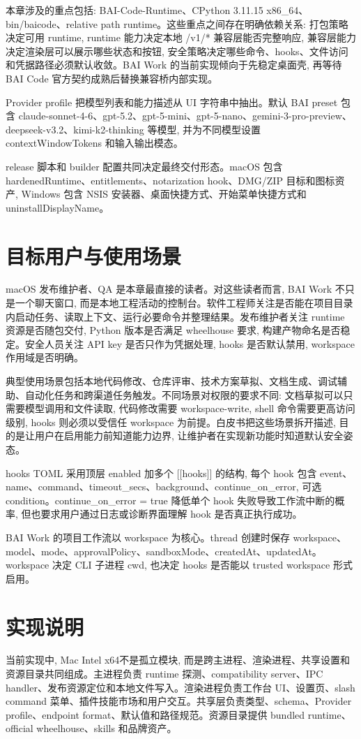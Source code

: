 本章涉及的重点包括: BAI-Code-Runtime、CPython 3.11.15 x86\_64、bin/baicode、relative path runtime。这些重点之间存在明确依赖关系: 打包策略决定可用 runtime, runtime 能力决定本地 /v1/* 兼容层能否完整响应, 兼容层能力决定渲染层可以展示哪些状态和按钮, 安全策略决定哪些命令、hooks、文件访问和凭据路径必须默认收敛。BAI Work 的当前实现倾向于先稳定桌面壳, 再等待 BAI Code 官方契约成熟后替换兼容桥内部实现。

Provider profile 把模型列表和能力描述从 UI 字符串中抽出。默认 BAI preset 包含 claude-sonnet-4-6、gpt-5.2、gpt-5-mini、gpt-5-nano、gemini-3-pro-preview、deepseek-v3.2、kimi-k2-thinking 等模型, 并为不同模型设置 contextWindowTokens 和输入输出模态。

release 脚本和 builder 配置共同决定最终交付形态。macOS 包含 hardenedRuntime、entitlements、notarization hook、DMG/ZIP 目标和图标资产, Windows 包含 NSIS 安装器、桌面快捷方式、开始菜单快捷方式和 uninstallDisplayName。

\section{目标用户与使用场景}
macOS 发布维护者、QA 是本章最直接的读者。对这些读者而言, BAI Work 不只是一个聊天窗口, 而是本地工程活动的控制台。软件工程师关注是否能在项目目录内启动任务、读取上下文、运行必要命令并整理结果。发布维护者关注 runtime 资源是否随包交付, Python 版本是否满足 wheelhouse 要求, 构建产物命名是否稳定。安全人员关注 API key 是否只作为凭据处理, hooks 是否默认禁用, workspace 作用域是否明确。

典型使用场景包括本地代码修改、仓库评审、技术方案草拟、文档生成、调试辅助、自动化任务和跨渠道任务触发。不同场景对权限的要求不同: 文档草拟可以只需要模型调用和文件读取, 代码修改需要 workspace-write, shell 命令需要更高访问级别, hooks 则必须以受信任 workspace 为前提。白皮书把这些场景拆开描述, 目的是让用户在启用能力前知道能力边界, 让维护者在实现新功能时知道默认安全姿态。

hooks TOML 采用顶层 enabled 加多个 [[hooks]] 的结构, 每个 hook 包含 event、name、command、timeout\_secs、background、continue\_on\_error, 可选 condition。continue\_on\_error = true 降低单个 hook 失败导致工作流中断的概率, 但也要求用户通过日志或诊断界面理解 hook 是否真正执行成功。

BAI Work 的项目工作流以 workspace 为核心。thread 创建时保存 workspace、model、mode、approvalPolicy、sandboxMode、createdAt、updatedAt。workspace 决定 CLI 子进程 cwd, 也决定 hooks 是否能以 trusted workspace 形式启用。

\section{实现说明}
当前实现中, Mac Intel x64不是孤立模块, 而是跨主进程、渲染进程、共享设置和资源目录共同组成。主进程负责 runtime 探测、compatibility server、IPC handler、发布资源定位和本地文件写入。渲染进程负责工作台 UI、设置页、slash command 菜单、插件技能市场和用户交互。共享层负责类型、schema、Provider profile、endpoint format、默认值和路径规范。资源目录提供 bundled runtime、official wheelhouse、skills 和品牌资产。

